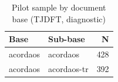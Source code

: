 \begin{table}[t]\centering\caption{Pilot sample by document base (TJDFT, diagnostic)}\label{tab:pilot_base}
\begin{tabular}{llr}\toprule Base & Sub-base & N \\ \midrule
acordaos & acordaos & 428 \\
acordaos & acordaos-tr & 392 \\
\bottomrule\end{tabular}\end{table}
